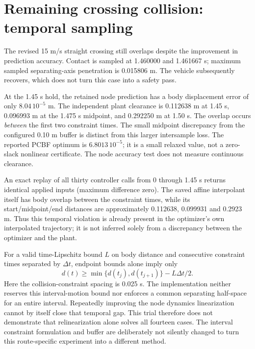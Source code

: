 \documentclass[11pt]{article}
\begin{document}
\section{Remaining crossing collision: temporal sampling}
The revised 15 m/s straight crossing still overlaps despite the improvement
in prediction accuracy. Contact is sampled at 1.460000 and 1.461667 s;
maximum sampled separating-axis penetration is 0.015806 m. The vehicle
subsequently recovers, which does not turn this case into a safety pass.

At the 1.45 s hold, the retained node prediction has a body displacement
error of only $8.04\,10^{-5}$ m. The independent plant clearance is
0.112638 m at 1.45 s, 0.096993 m at the 1.475 s midpoint, and 0.292250 m
at 1.50 s. The overlap occurs \emph{between} the first two constraint times.
The small midpoint discrepancy from the configured 0.10 m buffer is distinct
from this larger intersample loss. The reported PCBF optimum is
$6.8013\,10^{-5}$; it is a small relaxed value, not a zero-slack nonlinear
certificate. The node accuracy test does not measure continuous clearance.

An exact replay of all thirty controller calls from 0 through 1.45 s returns
identical applied inputs (maximum difference zero). The saved affine
interpolant itself has body overlap between the constraint times, while its
start/midpoint/end distances are approximately 0.112638, 0.099931 and
0.2923 m. Thus this temporal violation is already present in the optimizer's
own interpolated trajectory; it is not inferred solely from a discrepancy
between the optimizer and the plant.

For a valid time-Lipschitz bound $L$ on body distance and consecutive
constraint times separated by $\Delta t$, endpoint bounds alone imply only
\[
 d(t)\ge\min\{d(t_j),d(t_{j+1})\}-L\Delta t/2.
\]
Here the collision-constraint spacing is 0.025 s. The implementation neither
reserves this interval-motion bound nor enforces a common separating
half-space for an entire interval. Repeatedly improving the node dynamics
linearization cannot by itself close that temporal gap. This trial therefore
does not demonstrate that relinearization alone solves all fourteen cases.
The interval constraint formulation and buffer are deliberately not silently
changed to turn this route-specific experiment into a different method.
\end{document}

